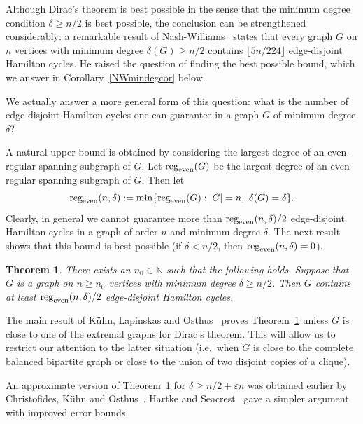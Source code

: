 \documentclass{memo-l}
\newtheorem{thm}[firstthm]{Theorem}
\def\COMMENT#1{}
\def\eps{\varepsilon}
\numberwithin{section}{chapter}
\numberwithin{equation}{section}
\numberwithin{firstthm}{section}
\numberwithin{figure}{section}
\begin{document}
Although Dirac's theorem is best possible in the sense that the minimum degree condition $\delta \ge n/2$ is best possible, 
the conclusion can be strengthened considerably:
a remarkable result of Nash-Williams~\cite{Diracext} states that every graph $G$ on $n$ vertices with minimum degree $\delta(G) \ge n/2$
contains $\lfloor 5n/224 \rfloor$ edge-disjoint Hamilton cycles.
He raised the question of finding the best possible bound, which we answer in Corollary~\ref{NWmindegcor} below.

We actually answer a more general form of this question: what is the number of edge-disjoint Hamilton cycles one can guarantee in a graph $G$ of minimum degree $\delta$?

A natural upper bound is obtained by considering the largest degree of an even-regular spanning subgraph of $G$.
Let $\textnormal{reg}_{\textnormal{even}}(G)$
be the largest degree of an even-regular spanning subgraph of $G$. Then let
\[
\textnormal{reg}_{\textnormal{even}}(n,\delta):=\min\{\textnormal{reg}_{\textnormal{even}}(G):|G|=n,\ \delta(G)=\delta\}.
\]
Clearly, in general we cannot guarantee more than $\textnormal{reg}_{\textnormal{even}}(n,\delta)/2$
edge-disjoint Hamilton cycles in a graph of order $n$ and minimum
degree $\delta$. The next result shows that this bound is best possible (if $\delta < n/2$, then $\textnormal{reg}_{\textnormal{even}}(n,\delta)=0$).%
\COMMENT{Andy: changed this so it is the same as the sentence added in paper II
by Deryk}
\begin{thm}\label{NWmindeg}
There exists an $n_0 \in \mathbb N$ such that the following holds. Suppose that $G$ is a graph on $n\ge n_0$ vertices with
minimum degree $\delta\ge n/2$. Then $G$ contains at least ${\rm reg}_{\rm even}(n,\delta)/2$ edge-disjoint Hamilton cycles.
\end{thm}

The main result of K\"uhn, Lapinskas and Osthus~\cite{KLOmindeg} proves Theorem~\ref{NWmindeg} unless $G$ is close to one of the extremal graphs for
Dirac's theorem.
This will allow us to restrict our attention to the latter situation (i.e.~when $G$ is close to
the complete balanced bipartite graph or close to the union of two disjoint copies of a clique).

An approximate version of Theorem~\ref{NWmindeg} for $\delta \ge n/2+\eps n$
was obtained earlier by Christofides, K\"uhn and Osthus~\cite{CKO}.
Hartke and Seacrest~\cite{HartkeHCs} gave a simpler argument with improved error bounds.
\end{document}
